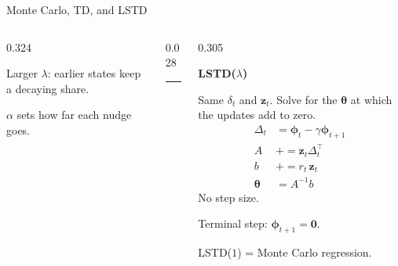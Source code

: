 \documentclass[aspectratio=169,11pt]{beamer}
\newcommand{\vphi}{\bm{\phi}}
\newcommand{\vz}{\mathbf{z}}
\newcommand{\vth}{\bm{\theta}}
\begin{document}
\begin{frame}{Monte Carlo, TD, and LSTD}
\begin{columns}[T,onlytextwidth]
\begin{column}{0.324\textwidth}
\begin{minipage}[t][4.35cm][t]{0.94\linewidth}
      Larger $\lambda$: earlier states keep a decaying share.\par
      $\alpha$ sets how far each nudge goes.
      \end{minipage}
    \end{column}
    \begin{column}{0.028\textwidth}
      \centering\textcolor{hair}{\rule{0.7pt}{4.35cm}}
    \end{column}
    \begin{column}{0.305\textwidth}
      \begin{minipage}[t][4.35cm][t]{0.94\linewidth}
      \raggedright
      {\color{accent}\small\bfseries LSTD($\lambda$)}\par\vspace{0.28em}
      Same $\delta_t$ and $\vz_t$. Solve for the $\vth$ at which the updates add to zero.
      \begin{align*}
        \Delta_t &= \vphi_t-\gamma\vphi_{t+1}\\
        A &\mathrel{+}= \vz_t\Delta_t^\top\\
        b &\mathrel{+}= r_t\,\vz_t\\
        \vth &= A^{-1}b
      \end{align*}
      No step size.\par
      Terminal step: $\vphi_{t+1}=\mathbf{0}$.\par
      LSTD($1$) = Monte Carlo regression.
      \end{minipage}
    \end{column}
  \end{columns}
\end{frame}
\end{document}
